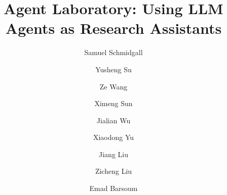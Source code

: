 \documentclass[11pt, a4paper]{gdm_format}
\title{Agent Laboratory: Using LLM Agents as Research Assistants}
\author[1, 2]{Samuel Schmidgall}
\author[1]{Yusheng Su}
\author[1]{Ze Wang}
\author[1]{Ximeng Sun}
\author[1]{Jialian Wu}
\author[1]{Xiaodong Yu}
\author[1]{Jiang Liu}
\author[1]{Zicheng Liu}
\author[1]{Emad Barsoum}
\affil[1]{AMD}
\affil[2]{Johns Hopkins University}
\begin{document}
\begin{abstract}






\end{abstract}
\end{document}
